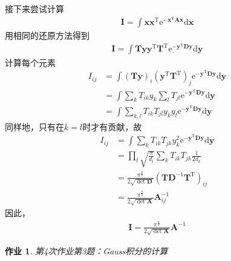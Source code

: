 \documentclass[12pt]{article}
\newtheorem{asg}{作业}
\begin{document}
    接下来尝试计算
    \begin{equation}\begin{aligned}
        \bm{I} = \int \bm{xx}^\mathrm{T} \mathrm{e}^{-\bm{x}^\mathrm{T}\bm{Ax}}\mathrm{d}\bm{x}
    \end{aligned}\end{equation}
    用相同的还原方法得到
    \begin{equation}\begin{aligned}
        \bm{I} = \int \bm{Ty}\bm{y}^\mathrm{T}\bm{T}^\mathrm{T} \mathrm{e}^{-\bm{y}^\mathrm{T}\bm{Dy}}\mathrm{d}\bm{y}
    \end{aligned}\end{equation}
    计算每个元素
    \begin{equation}\begin{aligned}
        I_{ij} &= \int (\bm{Ty})_{i}(\bm{y}^\mathrm{T}\bm{T}^\mathrm{T})_{j} \mathrm{e}^{-\bm{y}^\mathrm{T}\bm{Dy}}\mathrm{d}\bm{y}\\
        &= \int \sum_k T_{ik}y_k \sum_l T_{jl} \mathrm{e}^{-\bm{y}^\mathrm{T}\bm{Dy}}\mathrm{d}\bm{y}\\
        &= \int \sum_{k,l} T_{ik}T_{jl} y_ky_l \mathrm{e}^{-\bm{y}^\mathrm{T}\bm{Dy}}\mathrm{d}\bm{y}
    \end{aligned}\end{equation}
    同样地，只有在$k=l$时才有贡献，故
    \begin{equation}\begin{aligned}
        I_{ij} &= \int \sum_k T_{ik}T_{jk}y_k^2 \mathrm{e}^{-\bm{y}^\mathrm{T}\bm{Dy}}\mathrm{d}\bm{y}\\
        &= \prod_l \sqrt{\frac {\pi}{d_l}} \sum_k T_{ik}T_{jk} \frac 1{2d_k}\\
        &= \frac {\pi^{\frac n2}}{2 \sqrt{\det{\bm{D}}}} (\bm{TD}^{-1}\bm{T}^\mathrm{T})_{ij}\\
        &= \frac {\pi^{\frac n2}}{2 \sqrt{\det{\bm{A}}}} \bm{A}^{-1}_{ij}
    \end{aligned}\end{equation}
    因此，
    \begin{equation}\begin{aligned}
        \bm{I} = \frac {\pi^{\frac n2}}{2 \sqrt{\det{\bm{A}}}} \bm{A}^{-1}
    \end{aligned}\end{equation}
    \begin{asg}
        第4次作业第3题：Gauss积分的计算
    \end{asg}
\end{document}

